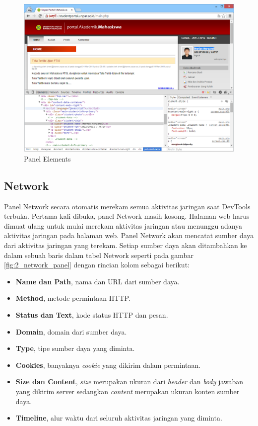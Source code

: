 \begin{figure}[H]
	\centering
	\includegraphics[scale=0.5]{Gambar/elements-panel}
	\caption{Panel Elements} 
	\label{fig:2_elements_panel}
\end{figure}

\subsection{Network}
Panel Network secara otomatis merekam semua aktivitas jaringan saat DevTools terbuka. Pertama kali dibuka, panel Network masih kosong. Halaman web harus dimuat ulang untuk mulai merekam aktivitas jaringan atau menunggu adanya aktivitas jaringan pada halaman web. Panel Network akan mencatat sumber daya dari aktivitas jaringan yang terekam. Setiap sumber daya akan ditambahkan ke dalam sebuah baris dalam tabel Network seperti pada gambar \ref{fig:2_network_panel} dengan rincian kolom sebagai berikut:
\begin{itemize}
	\item \textbf{Name dan Path}, nama dan URL dari sumber daya.
	\item \textbf{Method}, metode permintaan HTTP.
	\item \textbf{Status dan Text}, kode status HTTP dan pesan.
	\item \textbf{Domain}, domain dari sumber daya.
	\item \textbf{Type}, tipe sumber daya yang diminta.
	\item \textbf{Cookies}, banyaknya \textit{cookie} yang dikirim dalam permintaan.
	\item \textbf{Size dan Content}, \textit{size} merupakan ukuran dari \textit{header} dan \textit{body} jawaban yang dikirim server sedangkan \textit{content} merupakan ukuran konten sumber daya.
	\item \textbf{Timeline}, alur waktu dari seluruh aktivitas jaringan yang diminta.
\end{itemize}

